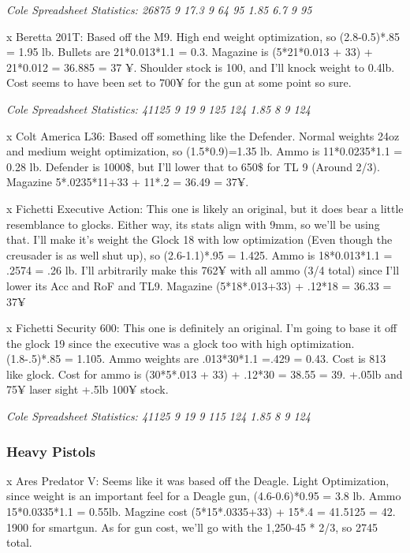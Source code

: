 \begin{multicols*}{2}
	\textit{\textcolor{OliveGreen}{Cole Spreadsheet Statistics: 26875 9 17.3 9 64 95 1.85 6.7 9 95}}
	
	x Beretta 201T: Based off the M9. High end weight optimization, so (2.8-0.5)*.85 = 1.95 lb. Bullets are 21*0.013*1.1 = 0.3. Magazine is (5*21*0.013 + 33) + 21*0.012 = 36.885 = 37 ¥. Shoulder stock is 100, and I'll knock weight to 0.4lb. Cost seems to have been set to 700¥ for the gun at some point so sure.
	
	\textit{\textcolor{OliveGreen}{Cole Spreadsheet Statistics: 41125 9 19 9 125 124 1.85 8 9 124}}
	
	x Colt America L36: Based off something like the Defender. Normal weights 24oz and medium weight optimization, so (1.5*0.9)=1.35 lb. Ammo is 11*0.0235*1.1 = 0.28 lb. Defender is 1000\$, but I'll lower that to 650\$ for TL 9 (Around 2/3). Magazine 5*.0235*11+33 + 11*.2 = 36.49 = 37¥.
	
	x Fichetti Executive Action: This one is likely an original, but it does bear a little resemblance to glocks. Either way, its stats align with 9mm, so we'll be using that. I'll make it's weight the Glock 18 with low optimization (Even though the creusader is as well shut up), so (2.6-1.1)*.95 = 1.425. Ammo is 18*0.013*1.1 = .2574 = .26 lb. I'll arbitrarily make this 762¥ with all ammo (3/4 total) since I'll lower its Acc and RoF and TL9. Magazine (5*18*.013+33) + .12*18 = 36.33 = 37¥
	
	x Fichetti Security 600: This one is definitely an original. I'm going to base it off the glock 19 since the executive was a glock too with high optimization. (1.8-.5)*.85 = 1.105. Ammo weights are .013*30*1.1 =.429 = 0.43. Cost is 813 like glock. Cost for ammo is (30*5*.013 + 33) + .12*30 = 38.55 = 39. +.05lb and 75¥ laser sight +.5lb 100¥ stock. 
	
	\textit{\textcolor{OliveGreen}{Cole Spreadsheet Statistics: 41125 9 19 9 115 124 1.85 8 9 124}}
	
	\subsubsection{Heavy Pistols}
	
	x Ares Predator V: Seems like it was based off the Deagle. Light Optimization, since weight is an important feel for a Deagle gun, (4.6-0.6)*0.95 = 3.8 lb. Ammo 15*0.0335*1.1 = 0.55lb. Magzine cost (5*15*.0335+33) + 15*.4 = 41.5125 = 42. 1900 for smartgun. As for gun cost, we'll go with the 1,250-45 * 2/3, so 2745 total.
	

\end{multicols*}
